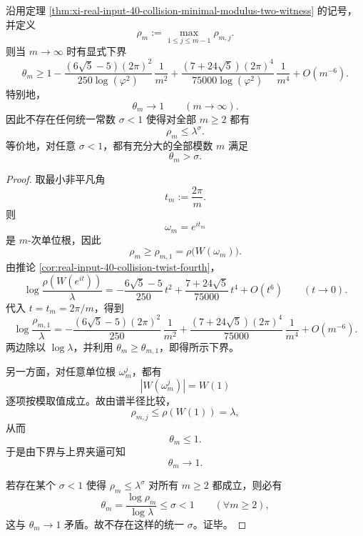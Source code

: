 \begin{theorem}\label{thm:xi-real-input-40-collision-worst-twist-exponent-tends-to-one}
沿用定理 \ref{thm:xi-real-input-40-collision-minimal-modulus-two-witness} 的记号，并定义
\[
\rho_m:=\max_{1\le j\le m-1}\rho_{m,j}.
\]
则当 \(m\to\infty\) 时有显式下界
\[
\boxed{\;
\theta_m
\ge
1-
\frac{(6\sqrt5-5)(2\pi)^2}{250\log(\varphi^2)}\,\frac1{m^2}
+
\frac{(7+24\sqrt5)(2\pi)^4}{75000\log(\varphi^2)}\,\frac1{m^4}
+
O(m^{-6}).\;}
\]
特别地，
\[
\theta_m\longrightarrow 1
\qquad (m\to\infty).
\]
因此不存在任何统一常数 \(\sigma<1\) 使得对全部 \(m\ge 2\) 都有
\[
\rho_m\le \lambda^\sigma.
\]
等价地，对任意 \(\sigma<1\)，都有充分大的全部模数 \(m\) 满足
\[
\theta_m>\sigma.
\]
\end{theorem}
\begin{proof}
取最小非平凡角
\[
t_m:=\frac{2\pi}{m}.
\]
则
\[
\omega_m=e^{it_m}
\]
是 \(m\)-次单位根，因此
\[
\rho_m\ge \rho_{m,1}=\rho\!\bigl(W(\omega_m)\bigr).
\]
由推论 \ref{cor:real-input-40-collision-twist-fourth}，
\[
\log\frac{\rho(W(e^{it}))}{\lambda}
=
-\frac{6\sqrt5-5}{250}\,t^2
+\frac{7+24\sqrt5}{75000}\,t^4
+O(t^6)
\qquad (t\to 0).
\]
代入 \(t=t_m=2\pi/m\)，得到
\[
\log\frac{\rho_{m,1}}{\lambda}
=
-\frac{(6\sqrt5-5)(2\pi)^2}{250}\,\frac1{m^2}
+\frac{(7+24\sqrt5)(2\pi)^4}{75000}\,\frac1{m^4}
+O(m^{-6}).
\]
两边除以 \(\log\lambda\)，并利用 \(\theta_m\ge \theta_{m,1}\)，即得所示下界。

另一方面，对任意单位根 \(\omega_m^j\)，都有
\[
|W(\omega_m^j)|=W(1)
\]
逐项按模取值成立。故由谱半径比较，
\[
\rho_{m,j}\le \rho(W(1))=\lambda,
\]
从而
\[
\theta_m\le 1.
\]
于是由下界与上界夹逼可知
\[
\theta_m\to 1.
\]

若存在某个 \(\sigma<1\) 使得 \(\rho_m\le \lambda^\sigma\) 对所有 \(m\ge 2\) 都成立，则必有
\[
\theta_m=\frac{\log\rho_m}{\log\lambda}\le \sigma<1
\qquad(\forall m\ge 2),
\]
这与 \(\theta_m\to 1\) 矛盾。故不存在这样的统一 \(\sigma\)。证毕。
\end{proof}

